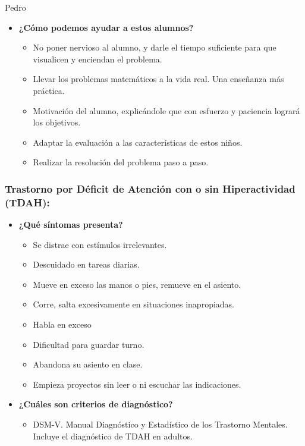 \begin{opin}{\pedrocolor}{Pedro}
\begin{itemize}
\item \textbf{¿Cómo podemos ayudar a estos alumnos?}
\begin{itemize}
\item No poner nervioso al alumno, y darle el tiempo suficiente para que  visualicen y enciendan el problema.
\item Llevar los problemas matemáticos a la vida real. Una enseñanza más práctica.
\item Motivación del alumno, explicándole que con esfuerzo y paciencia logrará los objetivos.
\item Adaptar la evaluación a las características de estos niños.
\item Realizar la resolución del problema paso a paso.

\end{itemize}
\end{itemize}

\subsubsection{Trastorno por Déficit de Atención con o sin Hiperactividad (TDAH):}

\begin{itemize}

\item \textbf{¿Qué síntomas presenta?}
\begin{itemize}
\item Se distrae con estímulos irrelevantes.
\item Descuidado en tareas diarias.
\item Mueve en exceso las manos o pies, remueve en el asiento.
\item Corre, salta excesivamente en situaciones inapropiadas.
\item Habla en exceso
\item Dificultad para guardar turno.
\item Abandona su asiento en clase.
\item Empieza proyectos sin leer o ni escuchar las indicaciones.
\end{itemize}

\item \textbf{¿Cuáles son criterios de diagnóstico?}
\begin{itemize}
\item DSM-V. Manual Diagnóstico y Estadístico de los Trastorno Mentales. Incluye el diagnóstico de TDAH en adultos.
\end{itemize}


\end{itemize}
\end{opin}
